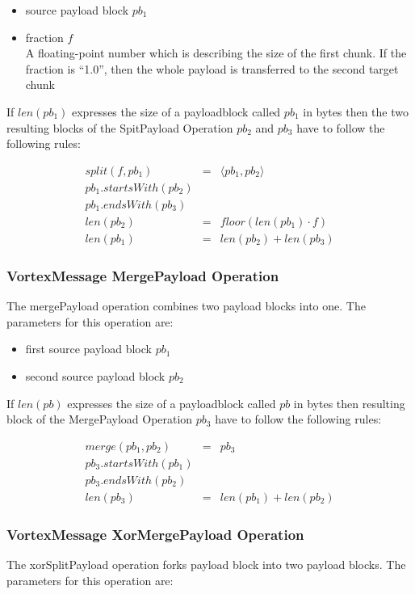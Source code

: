 \begin{itemize}
	\item source payload block $pb_1$
	\item fraction $f$\\
	A floating-point number which is describing the size of the first chunk. If the fraction is ``1.0'', then the whole payload is transferred to the second target chunk
\end{itemize}

If $len(pb_1)$ expresses the size of a payloadblock called $pb_1$ in bytes then the two resulting blocks of the SpitPayload Operation $pb_2$ and $pb_3$ have to follow the following rules:

\begin{eqnarray}
split(f, pb_1) & = &\langle pb_1, pb_2 \rangle\\
pb_1.startsWith(pb_2)\\
pb_1.endsWith(pb_3)\\
len(pb_2) & = & floor(len(pb_1)\cdot f)\\
len(pb_1) & = & len(pb_2) + len(pb_3)
\end{eqnarray}

\subsubsection{VortexMessage MergePayload Operation}
The mergePayload operation combines two payload blocks into one. The parameters for this operation are:

\begin{itemize}
	\item first source payload block $pb_1$
	\item second source payload block $pb_2$
\end{itemize}

If $len(pb)$ expresses the size of a payloadblock called $pb$ in bytes then resulting block of the MergePayload Operation $pb_3$ have to follow the following rules:

\begin{eqnarray}
merge(pb_1, pb_2) & = & pb_3 \\
pb_3.startsWith(pb_1)\\
pb_3.endsWith(pb_2)\\
len(pb_3) & = & len(pb_1) + len(pb_2)
\end{eqnarray}

\subsubsection{VortexMessage XorMergePayload Operation}
The xorSplitPayload operation forks payload block into two payload blocks. The parameters for this operation are:

